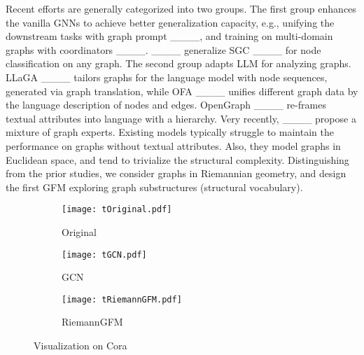 Recent efforts are generally categorized into two groups.
The first group enhances the vanilla GNNs to achieve better generalization capacity, e.g., unifying the downstream tasks with graph prompt ____, and training on multi-domain graphs with coordinators ____.
____ generalize SGC ____ for node classification on any graph.
The second group adapts LLM for analyzing graphs.
LLaGA ____ tailors graphs for the language model with node sequences, generated via graph translation,
while OFA ____  unifies different graph data by the language description of nodes and edges.
OpenGraph ____ re-frames textual attributes into language with a hierarchy.
Very recently, ____ propose a mixture of graph experts.
Existing models  typically struggle to maintain the performance on graphs without textual attributes.
Also, they model graphs in Euclidean space, and tend to trivialize the structural complexity.
Distinguishing from the prior studies, we consider graphs in Riemannian geometry, and design the first GFM exploring graph substructures (structural vocabulary).


\begin{figure}[t]
    \centering
    \begin{subfigure}{0.31\linewidth}
        \centering
        \texttt{[image: tOriginal.pdf]}
        \caption{Original}
        \label{fig:Original}
    \end{subfigure}
    \begin{subfigure}{0.31\linewidth}
        \centering
        \texttt{[image: tGCN.pdf]}
        \caption{GCN}
        \label{fig:GCN}
    \end{subfigure}
    \begin{subfigure}{0.31\linewidth}
        \centering
        \texttt{[image: tRiemannGFM.pdf]}
        \caption{RiemannGFM}
        \label{fig:RiemannGFM}
    \end{subfigure}
        \vspace{-0.1in}  
    \caption{Visualization on Cora}
    \label{fig:tSNE}
    \vspace{-0.15in}
\end{figure}

